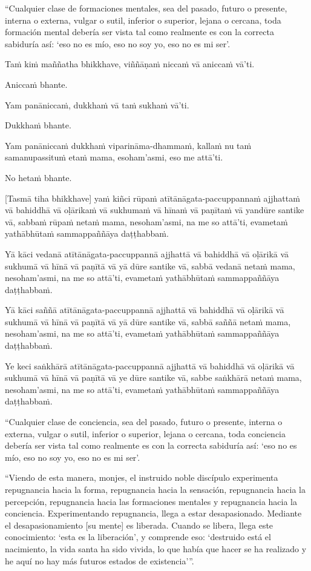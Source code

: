“Cualquier clase de formaciones mentales, sea del pasado, futuro o presente, interna o externa, vulgar o sutil, inferior o superior, lejana o cercana, toda formación mental debería ser vista tal como realmente es con la correcta sabiduría así: ‘eso no es mío, eso no soy yo, eso no es mi ser’.



\clearpage

\paliText
\markboth{\paliTitle}{\rightmark}

Taṁ kiṁ maññatha bhikkhave, viññāṇaṁ niccaṁ vā aniccaṁ vā'ti.

Aniccaṁ bhante.

Yam panāniccaṁ, dukkhaṁ vā taṁ sukhaṁ vā'ti.

Dukkhaṁ bhante.

Yam panāniccaṁ dukkhaṁ viparināma-dhammaṁ, kallaṁ nu taṁ samanupassituṁ
etaṁ mama, esoham'asmi, eso me attā'ti.

No hetaṁ bhante.

[Tasmā tiha bhikkhave] yaṁ kiñci rūpaṁ atītānāgata-paccuppannaṁ ajjhattaṁ
vā bahiddhā vā oḷārikaṁ vā sukhumaṁ vā hīnaṁ vā paṇītaṁ vā yandūre
santike vā, sabbaṁ rūpaṁ netaṁ mama, nesoham'asmi, na me so attā'ti,
evametaṁ yathābhūtaṁ sammappaññāya daṭṭhabbaṁ.

Yā kāci vedanā atītānāgata-paccuppannā ajjhattā vā bahiddhā vā oḷārikā
vā sukhumā vā hīnā vā paṇītā vā yā dūre santike vā, sabbā vedanā netaṁ
mama, nesoham'asmi, na me so attā'ti, evametaṁ yathābhūtaṁ sammappaññāya
daṭṭhabbaṁ.

Yā kāci saññā atītānāgata-paccuppannā ajjhattā vā bahiddhā vā oḷārikā vā
sukhumā vā hīnā vā paṇītā vā yā dūre santike vā, sabbā saññā netaṁ mama,
nesoham'asmi, na me so attā'ti, evametaṁ yathābhūtaṁ sammappaññāya
daṭṭhabbaṁ.

Ye keci saṅkhārā atītānāgata-paccuppannā ajjhattā vā bahiddhā vā oḷārikā
vā sukhumā vā hīnā vā paṇītā vā ye dūre santike vā, sabbe saṅkhārā netaṁ
mama, nesoham'asmi, na me so attā'ti, evametaṁ yathābhūtaṁ sammappaññāya
daṭṭhabbaṁ.

\clearpage

\englishText
\markboth{\englishTitle}{\rightmark}

“Cualquier clase de conciencia, sea del pasado, futuro o presente, interna o externa, vulgar o sutil, inferior o superior, lejana o cercana, toda conciencia debería ser vista tal como realmente es con la correcta sabiduría así: ‘eso no es mío, eso no soy yo, eso no es mi ser’.

“Viendo de esta manera, monjes, el instruido noble discípulo experimenta repugnancia hacia la forma, repugnancia hacia la sensación, repugnancia hacia la percepción, repugnancia hacia las formaciones mentales y repugnancia hacia la conciencia. Experimentando repugnancia, llega a estar desapasionado. Mediante el desapasionamiento [su mente] es liberada. Cuando se libera, llega este conocimiento: ‘esta es la liberación’, y comprende eso: ‘destruido está el nacimiento, la vida santa ha sido vivida, lo que había que hacer se ha realizado y he aquí no hay más futuros estados de existencia’”.

